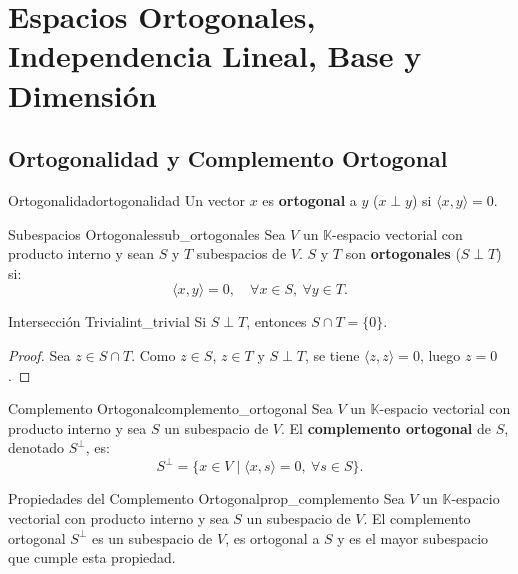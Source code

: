 \documentclass[11pt, a4paper]{article}
\begin{document}
\newpage

\section{Espacios Ortogonales, Independencia Lineal, Base y Dimensión}

\subsection{Ortogonalidad y Complemento Ortogonal}

\begin{definicion}{Ortogonalidad}{ortogonalidad}
Un vector $x$ es \textbf{ortogonal} a $y$ ($x \perp y$) si $\langle x, y \rangle = 0$.
\end{definicion}

\begin{definicion}{Subespacios Ortogonales}{sub_ortogonales}
Sea $V$ un $\mathbb{K}$-espacio vectorial con producto interno y sean $S$ y $T$ subespacios de $V$.
$S$ y $T$ son \textbf{ortogonales} ($S \perp T$) si:
\[
\langle x, y \rangle = 0, \quad \forall x \in S, \ \forall y \in T.
\]
\end{definicion}

\begin{proposicion}{Intersección Trivial}{int_trivial}
Si $S \perp T$, entonces $S \cap T = \{0\}$.
\end{proposicion}

\begin{proof}
Sea $z \in S \cap T$. Como $z \in S$, $z \in T$ y $S \perp T$, se tiene $\langle z, z \rangle = 0$, luego $z = 0$.
\end{proof}

\begin{definicion}{Complemento Ortogonal}{complemento_ortogonal}
Sea $V$ un $\mathbb{K}$-espacio vectorial con producto interno y sea $S$ un subespacio de $V$. El \textbf{complemento ortogonal} de $S$, denotado $S^\perp$, es:
\[
S^\perp = \{ x \in V \mid \langle x, s \rangle = 0, \ \forall s \in S \}.
\]
\end{definicion}

\begin{proposicion}{Propiedades del Complemento Ortogonal}{prop_complemento}
Sea $V$ un $\mathbb{K}$-espacio vectorial con producto interno y sea $S$ un subespacio de $V$. El complemento ortogonal $S^\perp$ es un subespacio de $V$, es ortogonal a $S$ y es el mayor subespacio que cumple esta propiedad.
\end{proposicion}
\end{document}
